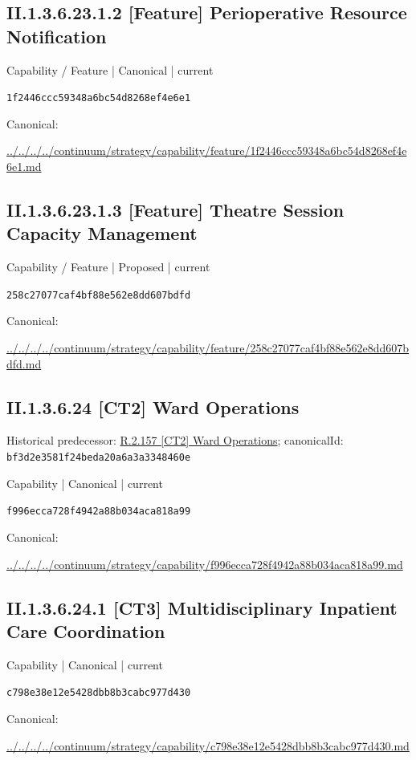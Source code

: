 \documentclass[10pt,a4paper]{article}
\begin{document}
\subsection*{II.1.3.6.23.1.2 [Feature] Perioperative Resource Notification}
\label{element-1f2446ccc59348a6bc54d8268ef4e6e1}
{\small Capability / Feature | Canonical | current}\par
\texttt{1f2446ccc59348a6bc54d8268ef4e6e1}\par
Canonical: \par
{\footnotesize\url{../../../../continuum/strategy/capability/feature/1f2446ccc59348a6bc54d8268ef4e6e1.md}}\par
\subsection*{II.1.3.6.23.1.3 [Feature] Theatre Session Capacity Management}
\label{element-258c27077caf4bf88e562e8dd607bdfd}
{\small Capability / Feature | Proposed | current}\par
\texttt{258c27077caf4bf88e562e8dd607bdfd}\par
Canonical: \par
{\footnotesize\url{../../../../continuum/strategy/capability/feature/258c27077caf4bf88e562e8dd607bdfd.md}}\par
\subsection*{II.1.3.6.24 [CT2] Ward Operations}
Historical predecessor: \hyperref[element-bf3d2e3581f24beda20a6a3a3348460e]{R.2.157 [CT2] Ward Operations}; canonicalId: \texttt{bf3d2e3581f24beda20a6a3a3348460e}\par
\label{element-f996ecca728f4942a88b034aca818a99}
{\small Capability | Canonical | current}\par
\texttt{f996ecca728f4942a88b034aca818a99}\par
Canonical: \par
{\footnotesize\url{../../../../continuum/strategy/capability/f996ecca728f4942a88b034aca818a99.md}}\par
\subsection*{II.1.3.6.24.1 [CT3] Multidisciplinary Inpatient Care Coordination}
\label{element-c798e38e12e5428dbb8b3cabc977d430}
{\small Capability | Canonical | current}\par
\texttt{c798e38e12e5428dbb8b3cabc977d430}\par
Canonical: \par
{\footnotesize\url{../../../../continuum/strategy/capability/c798e38e12e5428dbb8b3cabc977d430.md}}\par
\end{document}
